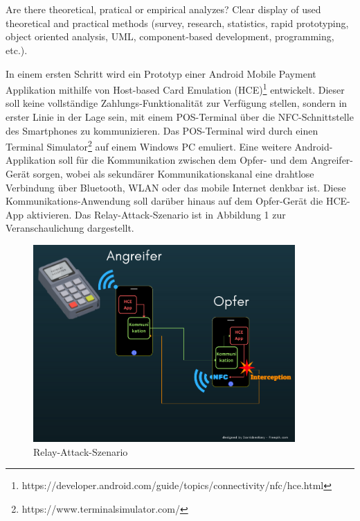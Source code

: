 \documentclass[a4paper,10pt,ngerman]{INSOexpose}
\begin{document}
\section{}

\langchooser
{
	Are there theoretical, pratical or empirical analyzes? Clear display of used theoretical and practical methods (survey, research, statistics, rapid prototyping, object oriented analysis, UML, component-based development, programming, etc.).
}
{
	In einem ersten Schritt wird ein Prototyp einer Android Mobile Payment Applikation mithilfe von Host-based Card Emulation (HCE)\footnote{https://developer.android.com/guide/topics/connectivity/nfc/hce.html} entwickelt. Dieser soll keine vollständige Zahlungs-Funktionalität zur Verfügung stellen, sondern in erster Linie in der Lage sein, mit einem POS-Terminal über die NFC-Schnittstelle des Smartphones zu kommunizieren. Das POS-Terminal wird durch einen Terminal Simulator\footnote{https://www.terminalsimulator.com/} auf einem Windows PC emuliert. Eine weitere Android-Applikation soll für die Kommunikation zwischen dem Opfer- und dem Angreifer-Gerät sorgen, wobei als sekundärer Kommunikationskanal eine drahtlose Verbindung über Bluetooth, WLAN oder das mobile Internet denkbar ist. Diese Kommunikations-Anwendung soll darüber hinaus auf dem Opfer-Gerät die HCE-App aktivieren. 
	Das Relay-Attack-Szenario ist in Abbildung 1 zur Veranschaulichung dargestellt.
	\newline
	\begin{figure}[h]
		\centering
		\includegraphics[width=10cm]{relay-szenario.png}
		\caption{Relay-Attack-Szenario}
	\end{figure} 
}
\end{document}
